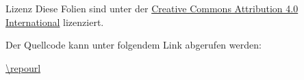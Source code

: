 
\begin{frame}{Lizenz}
    Diese Folien sind unter der \href{https://creativecommons.org/licenses/by/4.0/}{Creative Commons Attribution 4.0 International} lizenziert. \ccby
    
    Der Quellcode kann unter folgendem Link abgerufen werden:

    \url{\repourl}
\end{frame}
